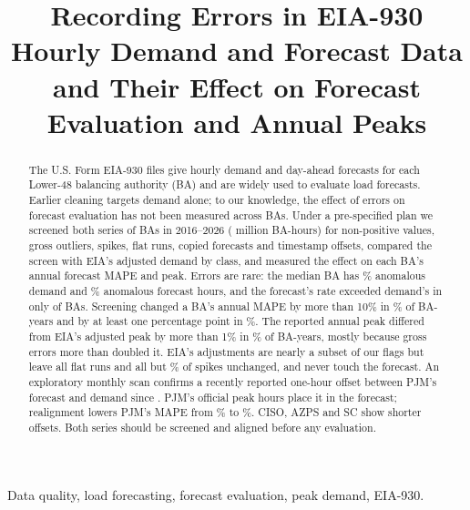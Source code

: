 \documentclass[conference,a4paper]{IEEEtran}
\begin{document}
\title{Recording Errors in EIA-930 Hourly Demand and Forecast Data and Their Effect on Forecast Evaluation and Annual Peaks}

\author{
}

\maketitle

\begin{abstract}
The U.S. Form EIA-930 files give hourly demand and day-ahead forecasts for each Lower-48 balancing authority (BA) and are widely used to evaluate load forecasts. Earlier cleaning targets demand alone; to our knowledge, the effect of errors on forecast evaluation has not been measured across BAs. Under a pre-specified plan we screened both series of  BAs in 2016--2026 ( million BA-hours) for non-positive values, gross outliers, spikes, flat runs, copied forecasts and timestamp offsets, compared the screen with EIA's adjusted demand by class, and measured the effect on each BA's annual forecast MAPE and peak. Errors are rare: the median BA has \% anomalous demand and \% anomalous forecast hours, and the forecast's rate exceeded demand's in only  of  BAs. Screening changed a BA's annual MAPE by more than 10\% in \% of BA-years and by at least one percentage point in \%. The reported annual peak differed from EIA's adjusted peak by more than 1\% in \% of BA-years, mostly because gross errors more than doubled it. EIA's adjustments are nearly a subset of our flags but leave all flat runs and all but \% of spikes unchanged, and never touch the forecast. An exploratory monthly scan confirms a recently reported one-hour offset between PJM's forecast and demand since . PJM's official peak hours place it in the forecast; realignment lowers PJM's MAPE from \% to \%. CISO, AZPS and SC show shorter offsets. Both series should be screened and aligned before any evaluation.
\end{abstract}

\begin{IEEEkeywords}
Data quality, load forecasting, forecast evaluation, peak demand, EIA-930.
\end{IEEEkeywords}
\end{document}
